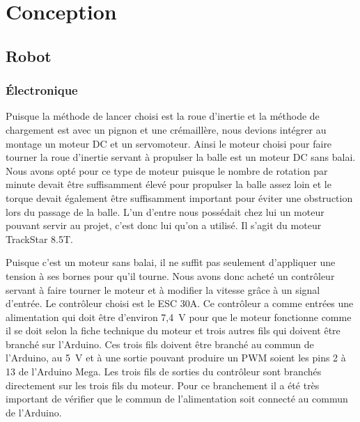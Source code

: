 \section{Conception}



\subsection{Robot}

\subsubsection{Électronique}

Puisque la méthode de lancer choisi est la roue d’inertie et la méthode de chargement est avec un pignon et une crémaillère, nous devions intégrer au montage un moteur DC et un servomoteur.
Ainsi le moteur choisi pour faire tourner la roue d’inertie servant à propulser la balle est un moteur DC sans balai.
Nous avons opté pour ce type de moteur puisque le nombre de rotation par minute devait être suffisamment élevé pour propulser la balle assez loin et le torque devait également être suffisamment important pour éviter une obstruction lors du passage de la balle.
L’un d’entre nous possédait chez lui un moteur pouvant servir au projet, c’est donc lui qu’on a utilisé.
Il s’agit du moteur TrackStar 8.5T.


Puisque c’est un moteur sans balai, il ne suffit pas seulement d’appliquer une tension à ses bornes pour qu’il tourne.
Nous avons donc acheté un contrôleur servant à faire tourner le moteur et à modifier la vitesse grâce à un signal d'entrée.
Le contrôleur choisi est le ESC 30A.
Ce contrôleur a comme entrées une alimentation qui doit être d’environ 7,4~V pour que le moteur fonctionne comme il se doit selon la fiche technique du moteur \cite{noauthor_trackstar_nodate} et trois autres fils qui doivent être branché sur l’Arduino.
Ces trois fils doivent être branché au commun de l’Arduino, au 5~V et à une sortie pouvant produire un PWM soient les pins 2 à 13 de l’Arduino Mega.
Les trois fils de sorties du contrôleur sont branchés directement sur les trois fils du moteur.
Pour ce branchement il a été très important de vérifier que le commun de l’alimentation soit connecté au commun de l’Arduino.

